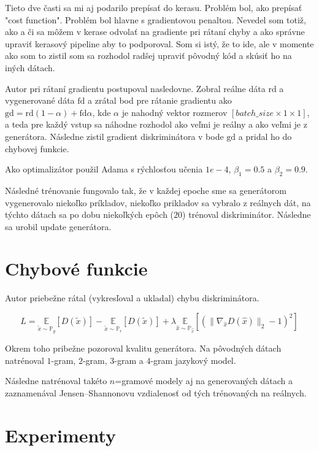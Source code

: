 \documentclass[10pt,a4paper]{article}
\begin{document}
Tieto dve časti sa mi aj podarilo prepísať do kerasu. Problém bol, ako prepísať "cost function". 
Problém bol hlavne s gradientovou penaltou.
Nevedel som totiž, ako a či sa môžem v kerase odvolať na gradiente pri rátaní chyby a ako správne upraviť kerasový pipeline aby to podporoval. 
Som si istý, že to ide, ale v momente ako som to zistil som sa rozhodol radšej upraviť pôvodný kód a skúsiť ho na iných dátach.

Autor pri rátaní gradientu postupoval nasledovne. 
Zobral reálne dáta $\mathrm{rd}$ a vygenerované dáta $\mathrm{fd}$ a zrátal bod pre rátanie gradientu ako $\mathrm{gd}= \mathrm{rd}(1-\alpha) + \mathrm{fd}\alpha$, kde $\alpha$ je nahodný vektor rozmerov $[batch\_size \times 1 \times 1]$, a teda pre každý vstup sa náhodne rozhodol ako veľmi je reálny a ako veľmi je z generátora.
Následne zistil gradient diskriminátora v bode $\mathrm{gd}$ a pridal ho do chybovej funkcie.

Ako optimalizátor použil Adama s rýchlosťou učenia $1e-4$, $\beta_1=0.5$ a $\beta_2=0.9$.

Následné trénovanie fungovalo tak, že v každej epoche sme sa generátorom vygenerovalo niekoľko príkladov, niekoľko prikladov sa vybralo z reálnych dát, na týchto dátach sa po dobu niekoľkých epôch ($20$) trénoval diskriminátor. Následne sa urobil update generátora.

\section{Chybové funkcie}

Autor priebežne rátal (vykresľoval a ukladal) chybu diskriminátora. 

$$L = \underset{\tilde{x} \sim \mathds{P}_g }{\mathds{E}} [D(\tilde{x})] - \underset{\tilde{x} \sim \mathds{P}_r }{\mathds{E}}[D(\tilde{x})] + \lambda\underset{\hat{x} \sim \mathds{P}_{\hat{x}}}{\mathds{E}} [(\parallel \nabla_{\hat{x}}D(\hat{x}) \parallel_2 - 1)^2]$$

Okrem toho pribežne pozoroval kvalitu generátora. 
Na pôvodných dátach natrénoval $1$-gram, $2$-gram, $3$-gram a $4$-gram jazykový model. 

Následne natrénoval takéto $n$=gramové modely aj na generovaných dátach a zaznamenával Jensen–Shannonovu vzdialenosť od tých trénovaných na reálnych.


\section{Experimenty}
\end{document}
